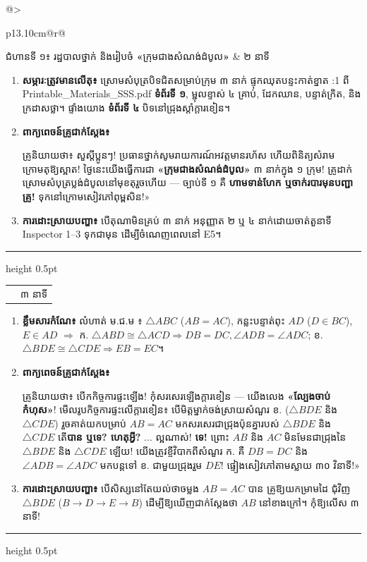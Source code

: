 \documentclass[a4paper,12pt]{article}
\makeatletter
\newcommand{\en}[1]{{\TimesEn #1}}
\newcommand{\enbf}[1]{{\TimesEn\textbf{#1}}}
\newcommand{\tri}[1]{\ensuremath{\triangle #1}}
\newcommand{\ang}[1]{\ensuremath{\angle #1}}
\newcommand{\cg}{\ensuremath{\cong}}
\newenvironment{phasebox}[3]{%
  \needspace{2.2cm}%
  \begin{tcolorbox}[
    enhanced, sharp corners, colback=headgray, colframe=black,
    boxrule=1.0pt, top=3.5pt, bottom=3.5pt, left=9pt, right=9pt,
    before skip=6pt, after skip=3pt
  ]%
    \linespread{1.0}\selectfont\renewcommand{\arraystretch}{1.0}%
    \begin{tabular*}{\linewidth}{@{}>{\raggedright\arraybackslash}p{13.10cm}@{\extracolsep{\fill}}r@{}}
      {\muol\fontsize{11pt}{14.5pt}\selectfont #1} & {\fontsize{10.5pt}{13.5pt}\selectfont\en{#2 |} #3}%
    \end{tabular*}%
  \end{tcolorbox}%
  \begingroup\fontsize{11.5pt}{14.92pt}\selectfont
}{%
  \par\endgroup\vspace{3pt}\hrule height 0.5pt\vspace{4pt}%
}
\makeatother
\begin{document}
\begin{phasebox}{ជំហានទី ១៖ រដ្ឋបាលថ្នាក់ និងរៀបចំ \enbf{«}ក្រុមជាងសំណង់ដំបូល\enbf{»}}{00--02 min}{២ នាទី}
  \begin{enumerate}[leftmargin=0.45cm, topsep=1.5pt, itemsep=2.2pt, parsep=0pt]
    \item \textbf{សម្ភារៈត្រូវមានលើតុ៖} ស្រោមសំបុត្របិទជិតសម្រាប់ក្រុម ៣ នាក់ ផ្ទុកឈុតបន្ទះកាត់ខ្នាត \en{1:1} ពី \en{Printable\_Materials\_SSS.pdf} \textbf{ទំព័រទី ១}, ម្ជុលខ្ទាស់ ៤ គ្រាប់, ដែកឈាន, បន្ទាត់ក្រិត, និងក្រដាសថ្លា។ ផ្ទាំងយោង \textbf{ទំព័រទី ៤} បិទនៅជ្រុងស្ដាំក្ដារខៀន។
    \item \textbf{ពាក្យពេចន៍គ្រូជាក់ស្ដែង៖}
      \begin{scriptbox}
        {\muol\fontsize{10.8pt}{14.5pt}\selectfont \enbf{«}គ្រូនិយាយថា៖} សួស្ដីប្អូនៗ! ប្រធានថ្នាក់សូមរាយការណ៍អវត្តមានរហ័ស ហើយពិនិត្យសំរាមក្រោមតុឱ្យស្អាត! ថ្ងៃនេះយើងធ្វើការជា \textbf{«ក្រុមជាងសំណង់ដំបូល»} ៣ នាក់ក្នុង ១ ក្រុម! គ្រូដាក់ស្រោមសំបុត្រប្លង់ដំបូលនៅមុខតុរួចហើយ — ច្បាប់ទី ១ គឺ \textbf{ហាមទាន់ហែក ឬចាក់របារមុនបញ្ជាគ្រូ!} ទុកនៅក្រោមសៀវភៅពុម្ពសិន!»
      \end{scriptbox}
    \item \textbf{ការដោះស្រាយបញ្ហា៖} បើតុណាមិនគ្រប់ ៣ នាក់ អនុញ្ញាត ២ ឬ ៤ នាក់ដោយចាត់តួនាទី \en{Inspector 1--3} ទុកជាមុន ដើម្បីចំណេញពេលនៅ \en{E5}។
  \end{enumerate}
\end{phasebox}

\begin{phasebox}{ជំហានទី ២ \enbf{(}ក\enbf{)}៖ កំណែកិច្ចការផ្ទះ ម\enbf{.}ជ\enbf{.}ម \enbf{--- «}ល្បែងចាប់កំហុស\enbf{»}}{02--05 min}{៣ នាទី}
  \begin{enumerate}[leftmargin=0.45cm, topsep=1.5pt, itemsep=2.2pt, parsep=0pt]
    \item \textbf{ខ្លឹមសារកំណែ៖} លំហាត់ ម.ជ.ម ៖ $\tri{ABC}$ ($AB=AC$), កន្លះបន្ទាត់ពុះ $AD$ ($D\in BC$), $E\in AD$ $\Rightarrow$ ក. $\tri{ABD}\cg\tri{ACD} \Rightarrow DB=DC, \ang{ADB}=\ang{ADC}$; ខ. $\tri{BDE}\cg\tri{CDE} \Rightarrow EB=EC$។
    \item \textbf{ពាក្យពេចន៍គ្រូជាក់ស្ដែង៖}
      \begin{scriptbox}
        {\muol\fontsize{10.8pt}{14.5pt}\selectfont \enbf{«}គ្រូនិយាយថា៖} បើកកិច្ចការផ្ទះឡើង! កុំសរសេរឡើងក្ដារខៀន — យើងលេង \textbf{«ល្បែងចាប់កំហុស»}! មើលរូបកិច្ចការផ្ទះលើក្ដារខៀន៖ បើមិត្តម្នាក់ចង់ស្រាយសំណួរ ខ. ($\tri{BDE}$ និង $\tri{CDE}$) រួចគាត់យកបម្រាប់ $AB = AC$ មកសរសេរជាជ្រុងប៉ុនគ្នារបស់ $\tri{BDE}$ និង $\tri{CDE}$ តើ\textbf{បាន ឬទេ? ហេតុអ្វី?} ... ល្អណាស់! \textbf{ទេ!} ព្រោះ $AB$ និង $AC$ មិនមែនជាជ្រុងនៃ $\tri{BDE}$ និង $\tri{CDE}$ ឡើយ! យើងត្រូវខ្ចីវិបាកពីសំណួរ ក. គឺ $DB = DC$ និង $\ang{ADB} = \ang{ADC}$ មកបន្តទៅ ខ. ជាមួយជ្រុងរួម $DE$! ផ្ទៀងសៀវភៅតាមស្លាយ ៣០ វិនាទី!»
      \end{scriptbox}
    \item \textbf{ការដោះស្រាយបញ្ហា៖} បើសិស្សនៅតែយល់ថាចម្លង $AB=AC$ បាន គ្រូឱ្យយកម្រាមដៃ \en{[tracing]} ជុំវិញ $\tri{BDE}$ ($B\to D\to E\to B$) ដើម្បីឱ្យឃើញជាក់ស្ដែងថា $AB$ នៅខាងក្រៅ។ កុំឱ្យលើស ៣ នាទី!
  \end{enumerate}
\end{phasebox}
\end{document}
